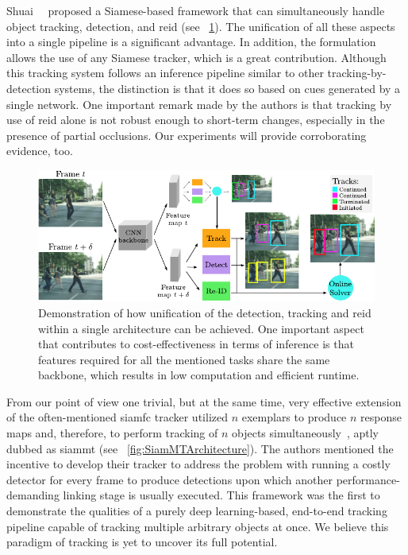 Shuai~\etal{}~\cite{shuai2020multisiamrcnn} proposed a Siamese-based framework that can simultaneously handle object tracking, detection, and \gls{reid} (see \figtext{}~\ref{fig:MultiSiamRCNN}). The unification of all these aspects into a single pipeline is a significant advantage. In addition, the formulation allows the use of any Siamese tracker, which is a great contribution. Although this tracking system follows an inference pipeline similar to other tracking-by-detection systems, the distinction is that it does so based on cues generated by a single network. One important remark made by the authors is that tracking by use of \gls{reid} alone is not robust enough to short-term changes, especially in the presence of partial occlusions. Our experiments will provide corroborating evidence, too.

\begin{figure}[!t]
    \centerline{\includegraphics[width=\linewidth]{figures/theoretical_foundations/motsiam_trackrcnn_architecture.pdf}}
    \caption[Siamese \gls{mot} with track R-CNN]{Demonstration of how unification of the detection, tracking and \gls{reid} within a single architecture can be achieved. One important aspect that contributes to cost-effectiveness in terms of inference is that features required for all the mentioned tasks share the same backbone, which results in low
        computation and efficient runtime. }
    \label{fig:MultiSiamRCNN}
\end{figure}

From our point of view one trivial, but at the same time, very effective extension of the often-mentioned \gls{siamfc} tracker utilized $n$ exemplars to produce $n$ response maps and, therefore, to perform tracking of $n$ objects simultaneously~\cite{vaquero2021siammt}, aptly dubbed as \gls{siammt} (see \figtext{}~\ref{fig:SiamMTArchitecture}). The authors mentioned the incentive to develop their tracker to address the problem with running a costly detector for every frame to produce detections upon which another performance-demanding linking stage is usually executed. This framework was the first to demonstrate the qualities of a purely deep learning-based, end-to-end tracking pipeline capable of tracking multiple arbitrary objects at once. We believe this paradigm of tracking is yet to uncover its full potential.


